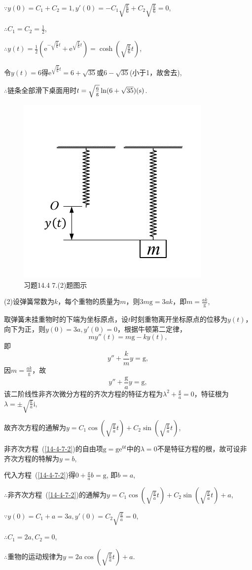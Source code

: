 \documentclass[12pt,UTF8,fleqn]{ctexart}
\newcommand{\me}[0]{\mathrm e}
\newcommand{\m}[0]{\mathrm }
\begin{document}
\begin{enumerate}
$\because y(0)=C_1+C_2=1,y'(0)=-C_1\sqrt{\frac{\text{g}}6}+C_2\sqrt{\frac{\text{g}}6}=0$,

$\therefore C_1=C_2=\frac12$,

$\therefore y(t)=\frac12(\me^{-\sqrt{\frac{\text{g}}6}t}+\me^{\sqrt{\frac{\text{g}}6}t})=\cosh(\sqrt{\frac{\text{g}}6}t)$,

令$y(t)=6$得$\me^{\sqrt{\frac{\text{g}}6}t}=6+\sqrt{35}$或$6-\sqrt{35}$(小于1，故舍去),

$\therefore$链条全部滑下桌面用时$t=\sqrt{\frac6{\text g}}\ln(6+\sqrt{35})(\text{s})$.

\begin{figure}[H]
\begin{center}
\includegraphics[height=0.5\textheight]{Figures27/14-4-7-1.pdf}
\end{center}
\caption{习题14.4 7.(2)题图示}
\end{figure}

(2)设弹簧常数为$k$，每个重物的质量为$m$，则$3m\m g=3ak$，即$m=\frac{ak}{\m g}$,

取弹簧未挂重物时的下端为坐标原点，设$t$时刻重物离开坐标原点的位移为$y(t)$，向下为正，则$y(0)=3a,y'(0)=0$，根据牛顿第二定律，
\[my''(t)=m\m g-ky(t),\]
即\[y''+\frac kmy=\m g,\]
因$m=\frac{ak}{\m g}$，故
\begin{equation}\label{14-4-7-2}y''+\frac{\m g}ay=\m g,\end{equation}
该二阶线性非齐次微分方程的齐次方程的特征方程为$\lambda^2+\frac{\m g}a=0$，特征根为$\lambda=\pm\sqrt{\frac{\m g}a}\m i$,

故齐次方程的通解为$y=C_1\cos(\sqrt{\frac{\m g}a}t)+C_2\sin(\sqrt{\frac{\m g}a}t)$,

非齐次方程~(\ref{14-4-7-2})的自由项$\m g=\m g\me^{0t}$中的$\lambda=0$不是特征方程的根，故可设非齐次方程的特解为$y=b$, 

代入方程~(\ref{14-4-7-2})得$0+\frac{\m g}ab=\m g$, 即$b=a$,

$\therefore$非齐次方程~(\ref{14-4-7-2})的通解为$y=C_1\cos(\sqrt{\frac{\m g}a}t)+C_2\sin(\sqrt{\frac{\m g}a}t)+a$,

$\because y(0)=C_1+a=3a,y'(0)=C_2\sqrt{\frac{\m g}a}=0$,

$\therefore C_1=2a,C_2=0$,

$\therefore$重物的运动规律为$y=2a\cos(\sqrt{\frac{\m g}a}t)+a$.
\end{enumerate}
\end{document}
